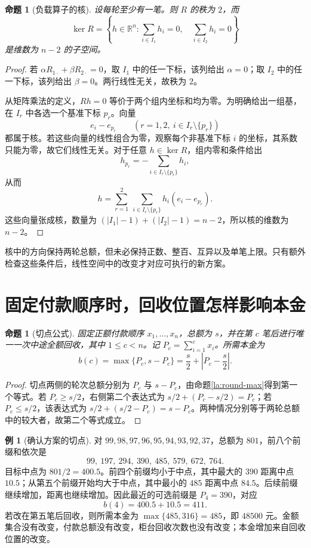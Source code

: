 \documentclass[UTF8,a4paper]{ctexbook}
\newtheorem{proposition}[theorem]{命题}
\theoremstyle{definition}
\newtheorem{example}[theorem]{例}
\numberwithin{equation}{chapter}
\newcommand{\1}{\mathbf{1}}
\begin{document}
\begin{proposition}[负载算子的核]\label{la:load-kernel}
设每轮至少有一笔。则 $R$ 的秩为 $2$，而
\[
\ker R=\left\{h\in\mathbb R^n:
\sum_{i\in I_1}h_i=0,\quad \sum_{i\in I_2}h_i=0\right\}
\]
是维数为 $n-2$ 的子空间。
\end{proposition}

\begin{proof}
若 $\alpha R_{1\cdot}+\beta R_{2\cdot}=0$，取 $I_1$ 中的任一下标，该列给出 $\alpha=0$；取 $I_2$ 中的任一下标，该列给出 $\beta=0$。两行线性无关，故秩为 $2$。

从矩阵乘法的定义，$Rh=0$ 等价于两个组内坐标和均为零。为明确给出一组基，在 $I_r$ 中各选一个基准下标 $p_r$。向量
\[
e_i-e_{p_r}\qquad(r=1,2,\ i\in I_r\setminus\{p_r\})
\]
都属于核。若这些向量的线性组合为零，观察每个非基准下标 $i$ 的坐标，其系数只能为零，故它们线性无关。对于任意 $h\in\ker R$，组内零和条件给出
\[
h_{p_r}=-\sum_{i\in I_r\setminus\{p_r\}}h_i,
\]
从而
\[
h=\sum_{r=1}^2\ \sum_{i\in I_r\setminus\{p_r\}}h_i(e_i-e_{p_r}).
\]
这些向量张成核，数量为 $(|I_1|-1)+(|I_2|-1)=n-2$，所以核的维数为 $n-2$。
\end{proof}

核中的方向保持两轮总额，但未必保持正数、整百、互异以及单笔上限。只有额外检查这些条件后，线性空间中的改变才对应可执行的新方案。

\section{固定付款顺序时，回收位置怎样影响本金}

\begin{proposition}[切点公式]\label{la:cut-formula}
固定正额付款顺序 $x_1,\ldots,x_n$，总额为 $s$，并在第 $c$ 笔后进行唯一一次中途全额回收，其中 $1\le c<n$。记 $P_c=\sum_{i=1}^c x_i$。所需本金为
\begin{equation}\label{la:cut-distance}
b(c)=\max\{P_c,s-P_c\}
=\frac{s}{2}+\left|P_c-\frac{s}{2}\right|.
\end{equation}
\end{proposition}

\begin{proof}
切点两侧的轮次总额分别为 $P_c$ 与 $s-P_c$，由命题\ref{la:round-max}得到第一个等式。若 $P_c\ge s/2$，右侧第二个表达式为 $s/2+(P_c-s/2)=P_c$；若 $P_c\le s/2$，该表达式为 $s/2+(s/2-P_c)=s-P_c$。两种情况分别等于两轮总额中的较大者，故第二个等式成立。
\end{proof}

\begin{example}[确认方案的切点]\label{la:cut-example}
对 $99,98,97,96,95,94,93,92,37$，总额为 $801$，前八个前缀和依次是
\[
99,\ 197,\ 294,\ 390,\ 485,\ 579,\ 672,\ 764.
\]
目标中点为 $801/2=400.5$。前四个前缀均小于中点，其中最大的 $390$ 距离中点 $10.5$；从第五个前缀开始均大于中点，其中最小的 $485$ 距离中点 $84.5$。后续前缀继续增加，距离也继续增加。因此最近的可选前缀是 $P_4=390$，对应
\[
b(4)=400.5+10.5=411.
\]
若改在第五笔后回收，则所需本金为 $\max\{485,316\}=485$，即 $48500$ 元。金额集合没有改变，付款总额没有改变，柜台回收次数也没有改变；本金增加来自回收位置的改变。
\end{example}
\end{document}
